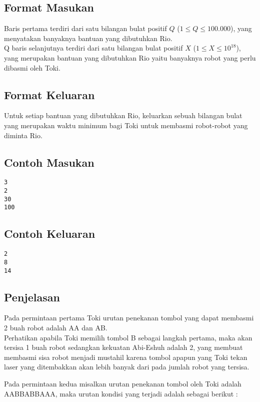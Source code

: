 \documentclass{article}
\begin{document}
\subsection*{Format Masukan}

Baris pertama terdiri dari satu bilangan bulat positif $Q$ ($1 \leq Q \leq 100.000$), yang menyatakan banyaknya bantuan yang dibutuhkan Rio.\\
Q baris selanjutnya terdiri dari satu bilangan bulat positif $X$ ($1 \leq X \leq 10^{18}$), yang merupakan bantuan yang dibutuhkan Rio yaitu banyaknya robot yang perlu dibasmi oleh Toki.

\subsection*{Format Keluaran}

Untuk setiap bantuan yang dibutuhkan Rio, keluarkan sebuah bilangan bulat yang merupakan waktu minimum bagi Toki untuk membasmi robot-robot yang diminta Rio.

\begin{multicols}{2}
\subsection*{Contoh Masukan}
\begin{lstlisting}
3
2
30
100
\end{lstlisting}
\columnbreak
\subsection*{Contoh Keluaran}
\begin{lstlisting}
2
8
14
\end{lstlisting}
\vfill
\null
\end{multicols}

\subsection*{Penjelasan}
Pada permintaan pertama Toki urutan penekanan tombol yang dapat membasmi 2 buah robot adalah AA dan AB.\\
Perhatikan apabila Toki memilih tombol B sebagai langkah pertama, maka akan tersisa 1 buah robot sedangkan kekuatan Abi-Eshuh adalah 2, yang membuat membasmi sisa robot menjadi mustahil karena tombol apapun yang Toki tekan laser yang ditembakkan akan lebih banyak dari pada jumlah robot yang tersisa.

\pagebreak
Pada permintaan kedua misalkan urutan penekanan tombol oleh Toki adalah AABBABBAAA, maka urutan kondisi yang terjadi adalah sebagai berikut : \\
\end{document}
